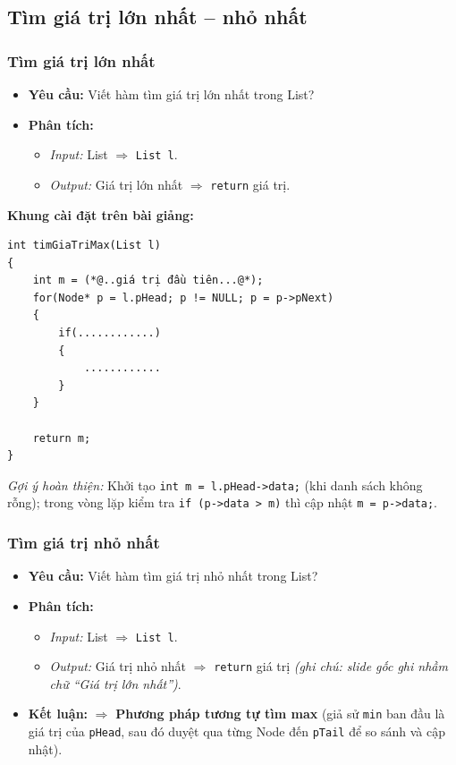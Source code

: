 \documentclass[12pt,a4paper]{article}
\begin{document}
\needspace{10.5cm}
\subsection{Tìm giá trị lớn nhất -- nhỏ nhất}

\subsubsection{Tìm giá trị lớn nhất}
\begin{itemize}[itemsep=0.15em]
    \item \textbf{Yêu cầu:} Viết hàm tìm giá trị lớn nhất trong List?
    \item \textbf{Phân tích:}
    \begin{itemize}
        \item \textit{Input:} List $\Rightarrow$ \texttt{List l}.
        \item \textit{Output:} Giá trị lớn nhất $\Rightarrow$ \texttt{return} giá trị.
    \end{itemize}
\end{itemize}
\textbf{Khung cài đặt trên bài giảng:}
\begin{lstlisting}
int timGiaTriMax(List l)
{
    int m = (*@..giá trị đầu tiên...@*);
    for(Node* p = l.pHead; p != NULL; p = p->pNext)
    {
        if(............)
        {
            ............
        }
    }

    return m;
}
\end{lstlisting}
\noindent\textit{Gợi ý hoàn thiện:} Khởi tạo \texttt{int m = l.pHead->data;} (khi danh sách không rỗng); trong vòng lặp kiểm tra \texttt{if (p->data > m)} thì cập nhật \texttt{m = p->data;}.

\subsubsection{Tìm giá trị nhỏ nhất}
\begin{itemize}[itemsep=0.15em]
    \item \textbf{Yêu cầu:} Viết hàm tìm giá trị nhỏ nhất trong List?
    \item \textbf{Phân tích:}
    \begin{itemize}
        \item \textit{Input:} List $\Rightarrow$ \texttt{List l}.
        \item \textit{Output:} Giá trị nhỏ nhất $\Rightarrow$ \texttt{return} giá trị \textit{(ghi chú: slide gốc ghi nhầm chữ ``Giá trị lớn nhất'')}.
    \end{itemize}
    \item \textbf{Kết luận:} $\Rightarrow$ \textbf{Phương pháp tương tự tìm max} (giả sử \texttt{min} ban đầu là giá trị của \texttt{pHead}, sau đó duyệt qua từng Node đến \texttt{pTail} để so sánh và cập nhật).
\end{itemize}
\end{document}
